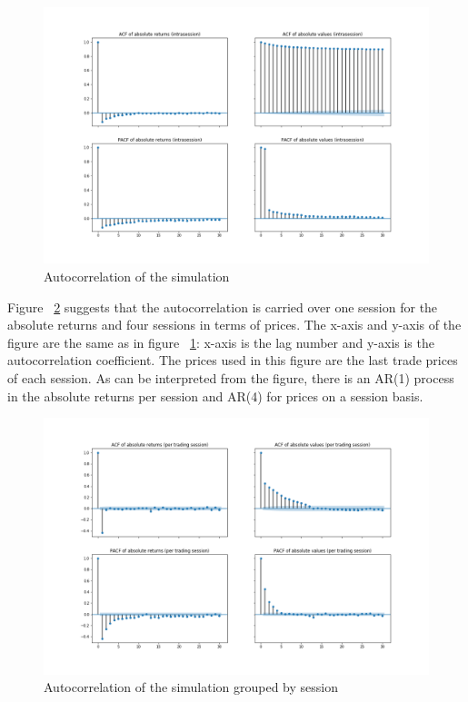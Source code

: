 \begin{figure}[H]
    \includegraphics[width=\linewidth]{plots/basic_autocorrelation_intra.png}
    \caption{Autocorrelation of the simulation}
    \label{fig:basic_autocorr}
\end{figure}

Figure ~\ref{fig:basic_autocorr_per_session} suggests that the autocorrelation is carried over one
session for the absolute returns and four sessions in terms of prices. The x-axis and y-axis of the figure are the same as 
in figure ~\ref{fig:basic_autocorr}: x-axis is the lag number and y-axis is the autocorrelation coefficient. 
The prices used in this figure are the last trade prices of each session. As can be interpreted from the figure, there is an AR(1) process in 
the absolute returns per session and AR(4) for prices on a session basis.

\begin{figure}[H]
    \includegraphics[width=\linewidth]{plots/basic_autocorrelation.png}
    \caption{Autocorrelation of the simulation grouped by session}
    \label{fig:basic_autocorr_per_session}
\end{figure}


